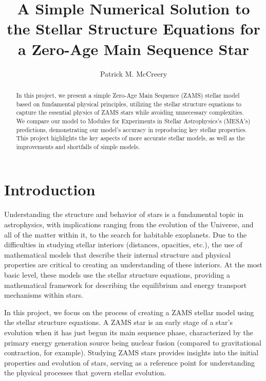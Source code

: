\documentclass[twocolumn]{aastex631}
\begin{document}
\title{A Simple Numerical Solution to the Stellar Structure Equations for a Zero-Age Main Sequence Star}

\author{Patrick M. McCreery}


\begin{abstract}

In this project, we present a simple Zero-Age Main Sequence (ZAMS) stellar model based on fundamental physical principles, utilizing the stellar structure equations to capture the essential physics of ZAMS stars while avoiding unnecessary complexities. We compare our model to Modules for Experiments in Stellar Astrophysics's (MESA's) predictions, demonstrating our model's accuracy in reproducing key stellar properties. This project highlights the key aspects of more accurate stellar models, as well as the improvements and shortfalls of simple models.

\end{abstract}


\section{Introduction} \label{sec:intro}

Understanding the structure and behavior of stars is a fundamental topic in astrophysics, with implications ranging from the evolution of the Universe, and all of the matter within it, to the search for habitable exoplanets. Due to the difficulties in studying stellar interiors (distances, opacities, etc.), the use of mathematical models that describe their internal structure and physical properties are critical to creating an understanding of these interiors. At the most basic level, these models use the stellar structure equations, providing a mathematical framework for describing the equilibrium and energy transport mechanisms within stars. 

In this project, we focus on the process of creating a ZAMS stellar model using the stellar structure equations. A ZAMS star is an early stage of a star's evolution when it has just begun its main sequence phase, characterized by the primary energy generation source being nuclear fusion (compared to gravitational contraction, for example). Studying ZAMS stars provides insights into the initial properties and evolution of stars, serving as a reference point for understanding the physical processes that govern stellar evolution.
\end{document}
